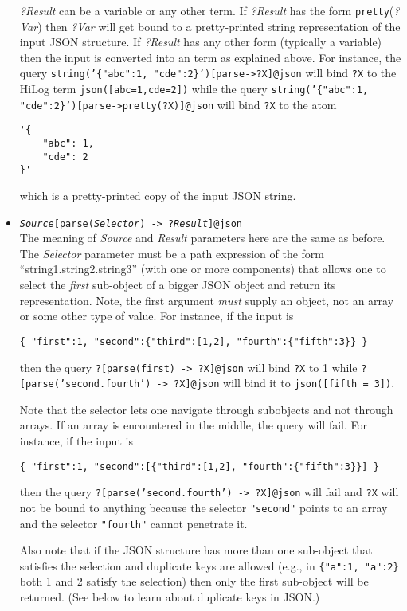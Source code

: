 \begin{itemize}
  \emph{?Result} can be a variable or any other term. If  \emph{?Result}
  has the form \texttt{pretty}(\emph{?Var})  then \emph{?Var}
  will get bound to a pretty-printed string representation of the input
  JSON structure. If \emph{?Result} has any other form (typically a
  variable) then the input is converted into an \ERGO term as explained
  above.
  For instance, the query 
  \texttt{string('\{"abc":1, "cde":2\}')[parse->?X]@\bs{}json}   
  will bind \texttt{?X} to the \ERGO HiLog term \texttt{json([abc=1,cde=2])}
  while the query  \texttt{string('\{"abc":1,
    "cde":2\}')[parse->pretty(?X)]@\bs{}json}  will bind \texttt{?X} to the atom
\begin{verbatim}
'{
    "abc": 1,
    "cde": 2
}'
\end{verbatim}
  which is a pretty-printed copy of the input JSON string.
\item
  \texttt{\emph{Source}[parse(\emph{Selector}) -> ?\emph{Result}]@\bs{}json}\\
  The meaning of \emph{Source}  and \emph{Result}  parameters here are the
  same as before.
  The \emph{Selector} parameter must be a path expression of the form
  ``string1.string2.string3'' (with one or more components) that allows
  one to select the \emph{first} sub-object of a bigger JSON object and
  return its
  representation. Note, the first argument \emph{must} supply an object, not an
  array or some other type of value. For instance, if the input is
\begin{verbatim}
{ "first":1, "second":{"third":[1,2], "fourth":{"fifth":3}} }  
\end{verbatim}
  then the query \texttt{?[parse(first) -> ?X]@\bs{}json} will bind
  \texttt{?X} to 1 while
  \texttt{?[parse('second.fourth') -> ?X]@\bs{}json} will bind it to
  \texttt{json([fifth = 3])}.

  Note that the selector lets one navigate through subobjects and not
  through arrays. If an array is encountered in the middle, the query will
  fail. For instance, if the input is
\begin{verbatim}
{ "first":1, "second":[{"third":[1,2], "fourth":{"fifth":3}}] }  
\end{verbatim}
  then the query \texttt{?[parse('second.fourth') -> ?X]@\bs{}json}
  will fail and \texttt{?X} will not be bound to anything because the
  selector \texttt{"second"} points to an array and the selector
  \texttt{"fourth"} cannot penetrate it. 

  Also note that if the JSON structure has more than one sub-object that
  satisfies the selection and duplicate keys are allowed
  (e.g., in \texttt{\{"a":1, "a":2\}} both 1 and 2 satisfy the selection)
  then only the first sub-object will be returned. (See below to learn about
  duplicate keys in JSON.)


\end{itemize}
